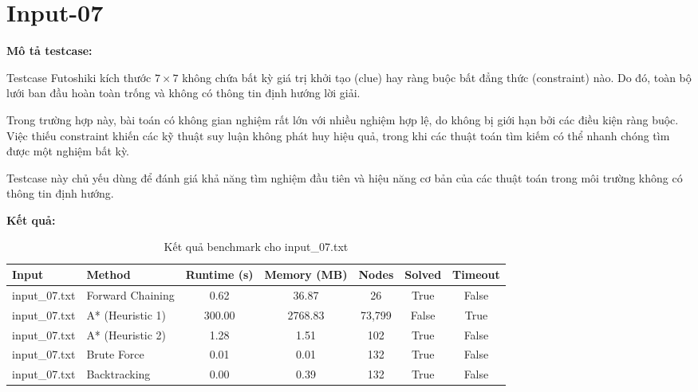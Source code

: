 \section{Input-07}
\textbf{Mô tả testcase:}

Testcase Futoshiki kích thước $7 \times 7$ không chứa bất kỳ giá trị khởi tạo (clue) hay ràng buộc bất đẳng thức (constraint) nào. Do đó, toàn bộ lưới ban đầu hoàn toàn trống và không có thông tin định hướng lời giải.

Trong trường hợp này, bài toán có không gian nghiệm rất lớn với nhiều nghiệm hợp lệ, do không bị giới hạn bởi các điều kiện ràng buộc. Việc thiếu constraint khiến các kỹ thuật suy luận không phát huy hiệu quả, trong khi các thuật toán tìm kiếm có thể nhanh chóng tìm được một nghiệm bất kỳ.

Testcase này chủ yếu dùng để đánh giá khả năng tìm nghiệm đầu tiên và hiệu năng cơ bản của các thuật toán trong môi trường không có thông tin định hướng.

\begin{center}
\end{center}

\textbf{Kết quả:}
\begin{table}[H]
\centering
\begin{tabular}{|l|l|c|c|c|c|c|}
\hline
\textbf{Input} & \textbf{Method} & \textbf{Runtime (s)} & \textbf{Memory (MB)} & \textbf{Nodes} & \textbf{Solved} & \textbf{Timeout} \\
\hline
input\_07.txt & Forward Chaining & 0.62 & 36.87 & 26 & True & False \\
input\_07.txt & A* (Heuristic 1) & 300.00 & 2768.83 & 73,799 & False & True \\
input\_07.txt & A* (Heuristic 2) & 1.28 & 1.51 & 102 & True & False \\
input\_07.txt & Brute Force & 0.01 & 0.01 & 132 & True & False \\
input\_07.txt & Backtracking & 0.00 & 0.39 & 132 & True & False \\
\hline
\end{tabular}
\caption{Kết quả benchmark cho input\_07.txt}
\end{table}

